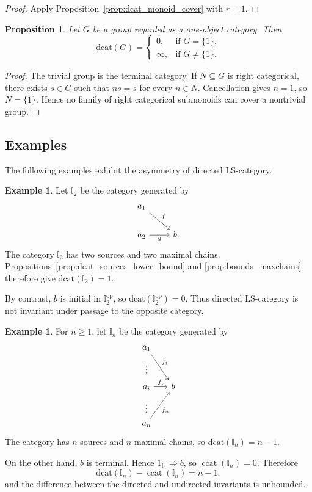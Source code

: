 \documentclass[12pt]{amsart}
\newtheorem{prop}[teo]{Proposition}
\theoremstyle{definition}
\newtheorem{example}[teo]{Example}
\theoremstyle{remark}
\numberwithin{figure}{section}%
\newcommand{\ccat}{\mathop{\mathrm{ccat}}}
\newcommand{\op}{\mathrm{op}}
\begin{document}
\begin{proof}
Apply Proposition~\ref{prop:dcat_monoid_cover} with \(r=1\).
\end{proof}

\begin{prop}\label{prop:dcat_group}
Let \(G\) be a group regarded as a one-object category. Then
\[
\mathrm{dcat}(G)
=
\begin{cases}
0, & \text{if }G=\{1\},\\
\infty, & \text{if }G\neq\{1\}.
\end{cases}
\]
\end{prop}

\begin{proof}
The trivial group is the terminal category. If \(N\subseteq G\) is right
categorical, there exists \(s\in G\) such that \(ns=s\) for every
\(n\in N\). Cancellation gives \(n=1\), so \(N=\{1\}\). Hence no family of
right categorical submonoids can cover a nontrivial group.
\end{proof}

\subsection{Examples}

The following examples exhibit the asymmetry of directed LS-category.

\begin{example}\label{ex:Opposite}
Let \(\mathbb I_2\) be the category generated by
\[
\begin{tikzcd}
a_1 \arrow[rd, "f"] & \\
a_2 \arrow[r, "g"'] & b .
\end{tikzcd}
\]
The category \(\mathbb I_2\) has two sources and two maximal chains.
Propositions~\ref{prop:dcat_sources_lower_bound} and
\ref{prop:bounds_maxchains} therefore give
\(\mathrm{dcat}(\mathbb I_2)=1\).

By contrast, \(b\) is initial in \(\mathbb I_2^{\op}\), so
\(\mathrm{dcat}(\mathbb I_2^{\op})=0\). Thus directed LS-category is not
invariant under passage to the opposite category.
\end{example}

\begin{example}\label{ex:arbitrary_gap_LS}
For \(n\geq1\), let \(\mathbb I_n\) be the category generated by
\[
\begin{tikzcd}[column sep=1.5em, row sep=0.4em]
a_1 \arrow[rdd, "f_1"] & \\
\vdots                 & \\
a_i \arrow[r, "f_i"]   & b \\
\vdots                 & \\
a_n \arrow[ruu, "f_n"'] &
\end{tikzcd}
\]
The category has \(n\) sources and \(n\) maximal chains, so
\(\mathrm{dcat}(\mathbb I_n)=n-1\).

On the other hand, \(b\) is terminal. Hence
\(1_{\mathbb I_n}\Rightarrow\overline b\), so
\(\ccat(\mathbb I_n)=0\). Therefore
\[
\mathrm{dcat}(\mathbb I_n)-\ccat(\mathbb I_n)=n-1,
\]
and the difference between the directed and undirected invariants is
unbounded.
\end{example}
\end{document}
